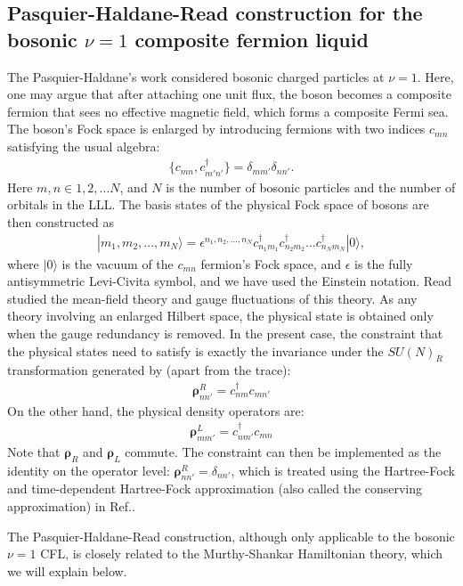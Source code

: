\subsection{Pasquier-Haldane-Read construction for the bosonic $\nu=1$ composite fermion liquid}
The Pasquier-Haldane's work \cite{pasquier1998dipole} considered bosonic charged particles at $\nu=1$. Here, one may argue that after attaching one unit flux, the boson becomes a composite fermion that sees no effective magnetic field, which forms a composite Fermi sea. The boson's Fock space is enlarged by introducing fermions with two indices $c_{mn}$ satisfying the usual algebra:
\begin{align}
\{c_{mn},c^\dagger_{m'n'}\}=\delta_{mm'}\delta_{nn'}.
\end{align}
Here $m,n\in 1,2,...N$, and $N$ is the number of bosonic particles and the number of orbitals in the LLL. The basis states of the physical Fock space of bosons are then constructed as
\begin{align}
|m_1,m_2,...,m_N\rangle=\epsilon^{n_1,n_2,...,n_N} c_{n_1m_1}^\dagger c_{n_2m_2}^\dagger ... c_{n_N m_N}^\dagger|0\rangle,\label{eq:Read_projection}
\end{align}
where $|0\rangle$ is the vacuum of the $c_{mn}$ fermion's Fock space, and $\epsilon$ is the fully antisymmetric Levi-Civita symbol, and we have used the Einstein notation. Read \cite{read1998lowest} studied the mean-field theory and gauge fluctuations of this theory. As any theory involving an enlarged Hilbert space, the physical state is obtained only when the gauge redundancy is removed. In the present case, the constraint that the physical states need to satisfy is exactly the invariance under the $SU(N)_R$ transformation generated by (apart from the trace):
\begin{align}
\pmb{\boldsymbol\rho}^R_{nn'}=c^\dagger_{nm} c_{mn'}
\end{align}
On the other hand, the physical density operators are:
\begin{align}
\pmb{\boldsymbol\rho}^L_{mm'}=c^\dagger_{nm'} c_{mn}
\end{align}
Note that $\pmb{\boldsymbol\rho}_R$ and $\pmb{\boldsymbol\rho}_L$ commute. The constraint can then be implemented as the identity on the operator level: $\pmb{\boldsymbol\rho}^R_{nn'}=\delta_{nn'}$, which is treated using the Hartree-Fock and time-dependent Hartree-Fock approximation (also called the conserving approximation) in Ref.\cite{read1998lowest}.

The Pasquier-Haldane-Read construction, although only applicable to the bosonic $\nu=1$ CFL, is closely related to the Murthy-Shankar Hamiltonian theory, which we will explain below.


